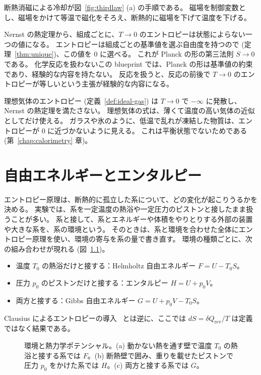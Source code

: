 断熱消磁による冷却が図~\ref{fig:thirdlaw} (a) の手順である。
磁場を制御変数とし、磁場をかけて等温で磁化をそろえ、断熱的に磁場を下げて温度を下げる。

Nernst の熱定理から、組成ごとに、$T \to 0$ のエントロピーは状態によらない一つの値になる。
エントロピーは組成ごとの基準値を選ぶ自由度を持つので (定理~\ref{thm:unique})、この値を $0$ に選べる。
これが Planck の形の第三法則 $S \to 0$ である。
化学反応を扱わないこの blueprint では、Planck の形は基準値の約束であり、経験的な内容を持たない。
反応を扱うと、反応の前後で $T \to 0$ のエントロピーが等しいという主張が経験的な内容になる。

理想気体のエントロピー (定義~\ref{def:ideal-gas}) は $T \to 0$ で $-\infty$ に発散し、Nernst の熱定理を満たさない。
理想気体の式は、薄くて温度の高い気体の近似としてだけ使える。
ガラスや氷のように、低温で乱れが凍結した物質は、エントロピーが $0$ に近づかないように見える。
これは平衡状態でないためである (第~\ref{chap:calorimetry} 章)。

\chapter{自由エネルギーとエンタルピー}
\label{chap:potentials}

エントロピー原理は、断熱的に孤立した系について、どの変化が起こりうるかを決める。
実験では、系を一定温度の熱浴や一定圧力のピストンと接したまま扱うことが多い。
系と接して、系とエネルギーや体積をやりとりする外部の装置や大きな系を、系の環境という。
そのときは、系と環境を合わせた全体にエントロピー原理を使い、環境の寄与を系の量で書き直す。
環境の種類ごとに、次の組み合わせが現れる (図~\ref{fig:potentials})。
\begin{itemize}
  \item 温度 $T_0$ の熱浴だけと接する：Helmholtz 自由エネルギー $F = U - T_0 S$。
  \item 圧力 $p_0$ のピストンだけと接する：エンタルピー $H = U + p_0 V$。
  \item 両方と接する：Gibbs 自由エネルギー $G = U + p_0 V - T_0 S$。
\end{itemize}
Clausius によるエントロピーの導入~\cite{Clausius1865} とは逆に、ここでは $dS = \delta Q_{\mathrm{rev}}/T$ は定義ではなく結果である。

\begin{figure}[htbp]
  \centering
  \caption{環境と熱力学ポテンシャル。(a) 動かない熱を通す壁で温度 $T_0$ の熱浴と接する系では $F$。(b) 断熱壁で囲み、重りを載せたピストンで圧力 $p_0$ をかけた系では $H$。(c) 両方と接する系では $G$。}
  \label{fig:potentials}
\end{figure}

